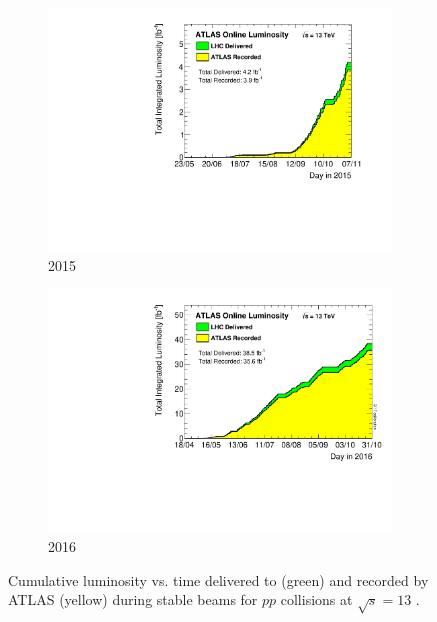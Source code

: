 \begin{figure}[htb!]
\centering
\captionsetup{justification=centering}
  \hspace{-2cm}
    \begin{subfigure}[b]{0.35\textwidth}
        \includegraphics[width=\textwidth,angle=-90]{figures/detector/Lumi_2015}
        \caption{2015}
        \label{fig:Lumi_2015}
    \end{subfigure}
    \quad
    \quad
    \quad
    \quad
    \begin{subfigure}[b]{0.35\textwidth}
        \includegraphics[width=\textwidth,angle=-90]{figures/detector/Lumi_2016}
        \caption{2016}
        \label{fig:Lumi_2016}
    \end{subfigure}
\caption{Cumulative luminosity vs. time delivered to (green) and recorded by ATLAS (yellow) during stable beams for $pp$ collisions at $\sqrt{s} = 13$ \TeV.}
\label{fig:Lumi}
\end{figure}

